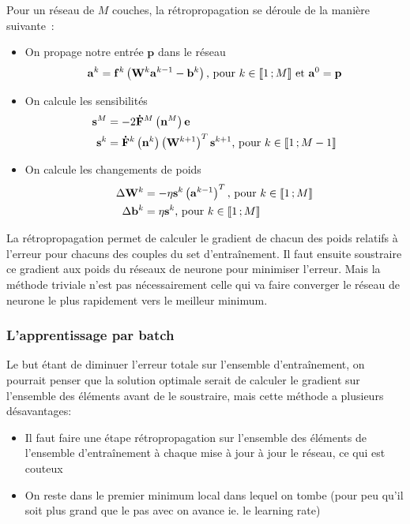Pour un réseau de $M$ couches, la rétropropagation se déroule de la manière suivante~:
\begin{itemize}
 \item On propage notre entrée $\mathbf{p}$ dans le réseau
 \begin{equation}
   \mathbf{a}^k = \mathbf{f}^k\left(\mathbf{W}^k\mathbf{a}^{k-1} - \mathbf{b}^k\right) \text{, pour $k \in \mathopen{\llbracket}1\,;M\mathclose{\rrbracket}$ et $\mathbf{a}^0 = \mathbf{p}$}
 \end{equation}
 
 \item On calcule les sensibilités 
 \begin{align}
  \mathbf{s}^M &= -2\mathbf{\dot F}^M\left(\mathbf{n}^M\right)\mathbf{e} \\
  \mathbf{s}^k &= \mathbf{\dot F}^k\left(\mathbf{n}^k\right)\left(\mathbf{W}^{k+1}\right)^T \mathbf{s}^{k+1} \text{, pour $k \in \mathopen{\llbracket}1\,;M-1\mathclose{\rrbracket}$}
 \end{align}
 
 \item On calcule les changements de poids
 \begin{align}
  \Delta \mathbf{W}^k &= - \eta \mathbf{s}^k\left(\mathbf{a}^{k-1}\right)^T \text{, pour $k \in \mathopen{\llbracket}1\,;M\mathclose{\rrbracket}$} \\
  \Delta \mathbf{b}^k &= \eta \mathbf{s}^k \text{, pour $k \in \mathopen{\llbracket}1\,;M\mathclose{\rrbracket}$}
 \end{align}

\end{itemize}

La rétropropagation permet de calculer le gradient de chacun des poids relatifs à l'erreur pour chacuns des couples du set d'entraînement. Il faut ensuite soustraire ce gradient
aux poids du réseaux de neurone pour minimiser l'erreur. Mais la méthode triviale n'est pas nécessairement celle qui va faire converger le réseau de neurone le plus rapidement vers le meilleur minimum.

\subsubsection{L'apprentissage par batch}

Le but étant de diminuer l'erreur totale sur l'ensemble d'entraînement, on pourrait penser que la solution optimale serait de calculer le gradient sur l'ensemble des éléments avant de le soustraire,
mais cette méthode a plusieurs désavantages:
\begin{itemize}
 \item Il faut faire une étape rétropropagation sur l'ensemble des éléments de l'ensemble d'entraînement à chaque mise à jour à jour le réseau, ce qui est couteux
 \item On reste dans le premier minimum local dans lequel on tombe (pour peu qu'il soit plus grand que le pas avec on avance ie. le learning rate)
\end{itemize}

